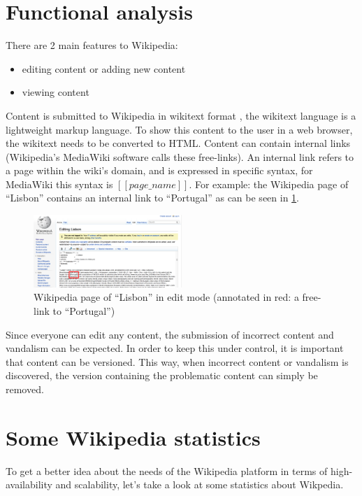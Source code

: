 \documentclass[12pt]{report}
\begin{document}
\section{Functional analysis}
There are 2 main features to Wikipedia:
\begin{itemize}
\item editing content or adding new content
\item viewing content
\end{itemize}
Content is submitted to Wikipedia in wikitext
format \cite{wikitext}, the wikitext language is a lightweight markup
language. To show this content to the user in a web browser, 
the wikitext needs to be converted to HTML.
Content can contain internal links (Wikipedia's MediaWiki software
calls these free-links). An internal link refers to a page within
the wiki's domain, and is expressed in specific syntax, for MediaWiki
this syntax is $[[page\_name]]$. For example: the Wikipedia page of ``Lisbon''
contains an internal link to ``Portugal'' as can be seen in
\ref{fig:lisbon_wikipedia}.

\begin{figure}[h!]
  \caption{Wikipedia page of ``Lisbon'' in edit mode (annotated in
    red: a free-link to ``Portugal'')}
  \label{fig:lisbon_wikipedia}
  \centering
    \includegraphics[width=0.5\textwidth]{pics/wikipedia_lisbon.png}
\end{figure}

Since everyone can edit any content, the submission of incorrect
content and vandalism can be expected. In
order to keep this under control, it is important that content can be
versioned.
This way, when incorrect content or vandalism is discovered, the
version containing the problematic content can simply be removed. \\

\section{Some Wikipedia statistics}
To get a better idea about the needs of the Wikipedia platform in
terms of high-availability and scalability, let's take a look at some
statistics about Wikpedia.
\end{document}
